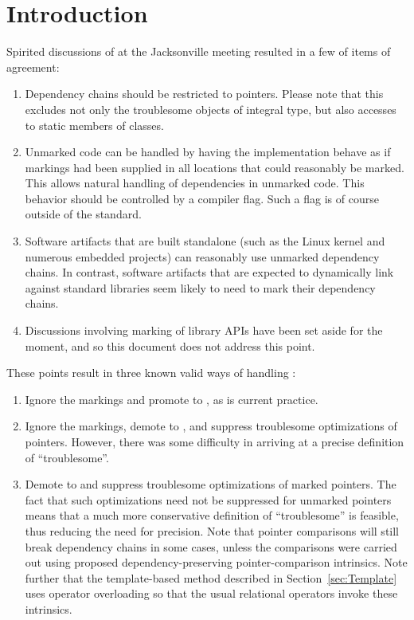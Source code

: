 \documentclass[letterpaper,twocolumn,10pt]{article}
\begin{document}
\section{Introduction}
\label{sec:Introduction}

Spirited discussions of 
at the Jacksonville meeting resulted in a few of items of agreement:

\begin{enumerate}
\item	Dependency chains should be restricted to pointers.
	Please note that this excludes not only the troublesome objects
	of integral type, but also accesses to static members of classes.
\item	Unmarked code can be handled by having the implementation
	behave as if markings had been supplied in all locations that
	could reasonably be marked.
	This allows natural handling of dependencies in unmarked code.
	This behavior should be controlled by a compiler flag.
	Such a flag is of course outside of the standard.
\item	Software artifacts that are built standalone (such as the Linux
	kernel and numerous embedded projects) can reasonably use
	unmarked dependency chains.
	In contrast, software artifacts that are expected to dynamically link
	against standard libraries seem likely to need to mark their
	dependency chains.
\item	Discussions involving marking of library APIs have been
	set aside for the moment, and so this document does not address
	this point.
\end{enumerate}

These points result in three known valid ways of handling
:

\begin{enumerate}
\item	Ignore the markings and promote 
	to , as is current practice.
\item	Ignore the markings, demote  to
	, and suppress troublesome
	optimizations of pointers.
	However, there was some difficulty in arriving at a precise
	definition of ``troublesome''.
\item	Demote  to 
	and suppress troublesome optimizations of marked pointers.
	The fact that such optimizations need not be suppressed
	for unmarked pointers means that a much more conservative
	definition of ``troublesome'' is feasible, thus reducing
	the need for precision.
	Note that pointer comparisons will still break dependency chains
	in some cases, unless the comparisons were carried out using
	proposed dependency-preserving pointer-comparison intrinsics.
	Note further that the template-based method described in
	Section~\ref{sec:Template}
	uses operator overloading so that the usual relational
	operators invoke these intrinsics.
\end{enumerate}
\end{document}
